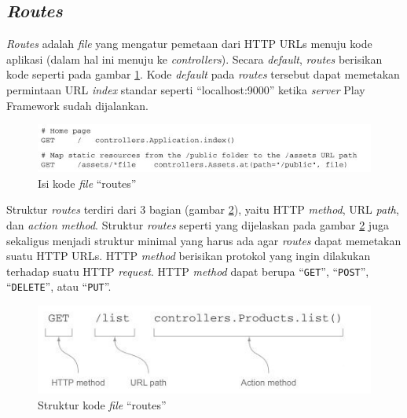 \subsection{\textit{Routes}}
\label{sec:routes}
\textit{Routes} adalah \textit{file} yang mengatur pemetaan dari HTTP URLs menuju kode aplikasi (dalam hal ini menuju ke \textit{controllers}). Secara \textit{default}, \textit{routes} berisikan kode seperti pada gambar \ref{fig:2_routes1}. Kode \textit{default} pada \textit{routes} tersebut dapat memetakan permintaan URL \textit{index} standar seperti ``localhost:9000'' ketika \textit{server} Play Framework sudah dijalankan.

\begin{figure}[htbp]
	\centering
		\includegraphics[scale=1]{Gambar/2_routes1.JPG}
	\caption{Isi kode \textit{file} ``routes''\cite{playforjava}}
	\label{fig:2_routes1}
\end{figure}

Struktur \textit{routes} terdiri dari 3 bagian (gambar \ref{fig:2_routes2}), yaitu HTTP \textit{method}, URL \textit{path}, dan \textit{action method}. Struktur \textit{routes} seperti yang dijelaskan pada gambar \ref{fig:2_routes2} juga sekaligus menjadi struktur minimal yang harus ada agar \textit{routes} dapat memetakan suatu HTTP URLs. HTTP \textit{method} berisikan protokol yang ingin dilakukan terhadap suatu HTTP \textit{request}. HTTP \textit{method} dapat berupa ``\texttt{GET}'', ``\texttt{POST}'', ``\texttt{DELETE}'', atau ``\texttt{PUT}''.

\begin{figure}[htbp]
	\centering
		\includegraphics[scale=1]{Gambar/2_routes2.JPG}
	\caption{Struktur kode \textit{file} ``routes''\cite{playforjava}}
	\label{fig:2_routes2}
\end{figure}
